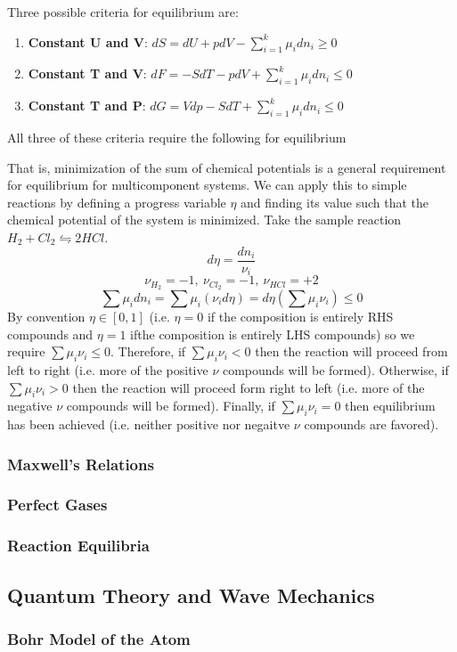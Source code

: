 \documentclass[12pt]{article}
\newcommand{\Item}[1]{\item \textbf{#1}:}
\newcommand{\CenteredBoxed}[1]{\begin{center}\boxed{#1}\end{center}}
\newcommand{\sumlim}[2]{\sum\limits_{#1}^{#2}}
\begin{document}
Three possible criteria for equilibrium are:
\begin{enumerate}
\Item{Constant U and V} $dS = dU + pdV - \sumlim{i=1}{k}\mu_idn_i \geq 0$
\Item{Constant T and V} $dF = -SdT - pdV + \sumlim{i=1}{k}\mu_idn_i \leq 0$
\Item{Constant T and P} $dG = Vdp - SdT + \sumlim{i=1}{k}\mu_idn_i \leq 0$
\end{enumerate}
All three of these criteria require the following for equilibrium
\CenteredBoxed{\sumlim{i=1}{k}\mu_idn_i \leq 0}
That is, minimization of the sum of chemical potentials is a general requirement for equilibrium for multicomponent systems. We can apply this to simple reactions by defining a progress variable $\eta$ and finding its value such that the chemical potential of the system is minimized. Take the sample reaction $H_2 + Cl_2 \leftrightharpoons 2HCl$.
$$d\eta = \frac{dn_i}{\nu_i}$$
$$\nu_{H_2} = -1,\ \nu_{Cl_2} = -1,\ \nu_{HCl} = +2$$ 
$$\sum\mu_idn_i=\sum\mu_i(\nu_id\eta)=d\eta\left(\sum\mu_i\nu_i\right)\leq0$$
By convention $\eta\in[0,1]$ (i.e. $\eta=0$ if the composition is entirely RHS compounds and $\eta=1$ ifthe composition is entirely LHS compounds) so we require $\sum\mu_i\nu_i\leq0$. Therefore, if $\sum\mu_i\nu_i<0$ then the reaction will proceed from left to right (i.e. more of the positive $\nu$ compounds will be formed). Otherwise, if $\sum\mu_i\nu_i>0$ then the reaction will proceed form right to left (i.e. more of the negative $\nu$ compounds will be formed). Finally, if $\sum\mu_i\nu_i=0$ then equilibrium has been achieved (i.e. neither positive nor negaitve $\nu$ compounds are favored).

\subsubsection{Maxwell's Relations}

\subsubsection{Perfect Gases}
\subsubsection{Reaction Equilibria}

\subsection{Quantum Theory and Wave Mechanics}
\subsubsection{Bohr Model of the Atom}
\end{document}
